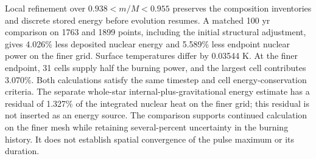 \documentclass[11pt,letterpaper]{article}
\begin{document}
Local refinement over $0.938<m/M<0.955$ preserves the composition
inventories and discrete stored energy before evolution resumes. A matched
100 yr comparison on 1763 and 1899 points, including the initial structural
adjustment, gives 4.026\% less deposited nuclear energy and 5.589\% less
endpoint nuclear power on the finer grid. Surface temperatures differ by
0.03544 K. At the finer endpoint, 31 cells supply half the burning power,
and the largest cell contributes 3.070\%. Both calculations satisfy the
same timestep and cell energy-conservation criteria. The separate
whole-star internal-plus-gravitational energy estimate has a residual of
1.327\% of the integrated nuclear heat on the finer grid; this residual
is not inserted as an energy source. The comparison supports continued
calculation on the finer mesh while retaining several-percent uncertainty
in the burning history. It does not establish spatial convergence of the
pulse maximum or its duration.
\end{document}

